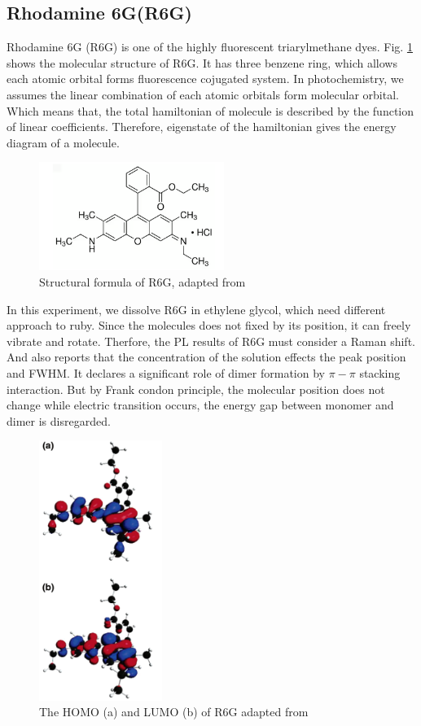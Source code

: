 \documentclass{article}
\begin{document}
\subsection{Rhodamine 6G(R6G)}
 Rhodamine 6G (R6G) is one of the highly fluorescent triarylmethane dyes.
 Fig. \ref{fig:rhodamine_structure} shows the molecular structure of R6G.
 It has three benzene ring, which allows each atomic orbital forms fluorescence cojugated system.
 In photochemistry, we assumes the linear combination of each atomic orbitals form molecular orbital.
 Which means that, the total hamiltonian of molecule is described by the function of linear coefficients.
 Therefore, eigenstate of the hamiltonian gives the energy diagram of a molecule.
 \begin{figure}[ht]
  \centering
  \includegraphics[width=6cm]{../results/Rhodamin_structure.png}
  \caption{Structural formula of R6G, adapted from \cite{rhodamine_sigma_aldrich}}
  \label{fig:rhodamine_structure}
 \end{figure}
 In this experiment, we dissolve R6G in ethylene glycol, which need different approach to ruby.
 Since the molecules does not fixed by its position, it can freely vibrate and rotate.
 Therfore, the PL results of R6G must consider a Raman shift.
 And also \cite{Rhodamine_dimer} reports that the concentration of the solution effects the peak position and FWHM.
 It declares a significant role of dimer formation by $\pi -\pi$ stacking interaction.
 But by Frank condon principle, the molecular position does not change while electric transition occurs, the energy gap between monomer and dimer is disregarded.

 \begin{figure}[ht]
  \centering
  \includegraphics[width=4cm]{../results/Rhodamine_homo_lumo.png}
  \caption{The HOMO (a) and LUMO (b) of R6G adapted from \cite{rhodamine_HOMO_LUMO}}
  \label{fig:rhodamine_homo_lumo}
 \end{figure}
\end{document}
